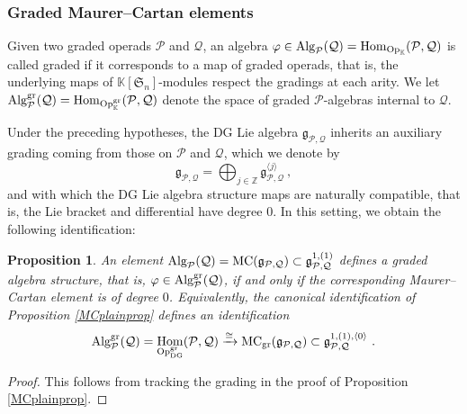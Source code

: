 \documentclass[11pt]{amsart}
\numberwithin{equation}{section}
\newtheorem{prop}[theo]{Proposition}
\theoremstyle{definition}
\newcommand{\bb}{\mathbb}
\newcommand{\mc}{\mathcal}
\newcommand{\mf}{\mathfrak}
\newcommand{\gPQ}{{\mathfrak{g}_{\mc P,\mc Q}}}
\newcommand{\gd}{{\textup{gr}}}
\DeclareMathOperator{\Hom}{Hom}
\newcommand{\K}{{\bb K}}
\newcommand{\End}{{\textup{End}}}
\newcommand{\Alg}{{\textup{Alg}}}
\newcommand{\Op}{{\textup{Op}}}
\newcommand{\MC}{{{\textup{MC}}}}
\newcommand{\0}{{\textbf{0}}}
\newcommand{\DG}{{\textup{DG}}}
\newcommand{\gr}{\textup{gr}}
\newcommand{\Z}{\bb Z}
\newcommand{\g}{{\mf{g}}}
\def \mf{\mathfrak}
\def \Op{\mathrm{Op}}
\begin{document}

\subsubsection{Graded Maurer--Cartan elements}

Given two graded operads $\mc P$ and $\mc Q$, an algebra $\varphi \in \Alg_{\mc P}(\mc Q)=\Hom_{\Op_\K}(\mc P, \mc Q)$ is called graded if it corresponds to a map of graded operads, that is, the underlying maps of $\K[\mf S_n]$-modules respect the gradings at each arity. We let $\Alg_{\mc P}^\gd(\mc Q)=\Hom_{\Op_\K^\gd}(\mc P, \mc Q)$ denote the space of graded $\mc P$-algebras internal to $\mc Q$.

Under the preceding hypotheses, the DG Lie algebra $\g_{\mc P, \mc Q}$ inherits an auxiliary grading coming from those on $\mc P$ and $\mc Q$, which we denote by
\[ \g_{\mc P, \mc Q}= \bigoplus_{j\in \Z} \g_{\mc P, \mc Q}^{\langle j \rangle } \ , \]
and with which the DG Lie algebra structure maps are naturally compatible, that is, the Lie bracket and differential have degree $0$. In this setting, we obtain the following identification:

\begin{prop} \label{prop:graded MC elements}
An element $ \Alg_{\mc P}(\mc Q)=\MC(\gPQ) \subset \g_{\mc P,\mc Q}^{1,(1)}$ defines a graded algebra structure, that is, $\varphi \in \Alg_{\mc P}^\gd(\mc Q)$, if and only if the corresponding Maurer--Cartan element is of degree $0$. Equivalently, the canonical identification of Proposition \ref{MCplainprop} defines an identification
	\[ \Alg_{\mc P}^\gd(\mc Q) =\Hom_{\Op_\DG^\gd}(\mc P, \mc Q)  \xrightarrow{\cong } \MC_\gr(\g_{\mc P, \mc Q}) \subset \g_{\mc P, \mc Q}^{1 ,(1),\langle 0 \rangle}  \ .\]
\end{prop}
\begin{proof} 
This follows from tracking the grading in the proof of Proposition \ref{MCplainprop}.

\end{proof}
\end{document}
